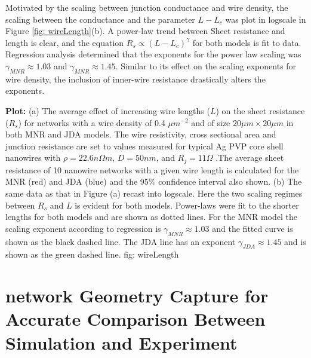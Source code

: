 Motivated by the scaling between junction conductance and wire density, the scaling between the conductance and the parameter $L - L_c$ was plot in logscale in Figure \ref{fig: wireLength}(b). A power-law trend between Sheet resistance and length is clear, and the equation  $R_s\propto(L-L_c)^{\gamma}$ for both models is fit to data. Regression analysis determined that the exponents for the power law scaling was $\gamma_{MNR} \approx 1.03$ and $\gamma_{MNR} \approx 1.45$. Similar to its effect on the scaling exponents for wire density, the inclusion of inner-wire resistance drastically alters the exponents.

{\textbf{Plot:} }
{(a) The average effect of increasing wire lengths ($L$) on the sheet resistance ($R_s$) for networks with a wire density of 0.4 $\mu m^{-2}$ and of size $20\mu m \times 20 \mu m$ in both MNR and JDA models. The wire resistivity, cross sectional area and junction resistance are set to values measured for typical Ag PVP core shell nanowires with $\rho = 22.6 n \Omega m$, $D = 50 nm$, and $R_j = 11 \Omega$ \cite{rocha2015}.The average sheet resistance of 10 nanowire networks with a given wire length is calculated for the MNR (red) and JDA (blue) and the 95\% confidence interval also shown. (b) The same data as that in Figure (a) recast into logscale. Here the two scaling regimes between $R_s$ and $L$ is evident for both models. Power-laws were fit to the shorter lengths for both models and are shown as dotted lines. For the MNR model the scaling exponent according to regression is $\gamma_{MNR} \approx 1.03$ and the fitted curve is shown as the black dashed line. The JDA line has an exponent $\gamma_{JDA} \approx 1.45$ and is shown as the green dashed line. }
{fig: wireLength}

\section{network Geometry Capture for Accurate Comparison Between Simulation and Experiment}
\label{sec:image_proc}

